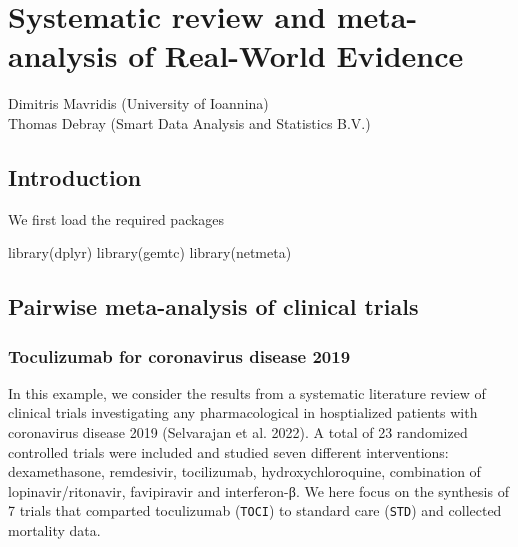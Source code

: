 \documentclass[
  letterpaper,
  DIV=11,
  numbers=noendperiod]{scrreprt}
\newenvironment{Shaded}{\begin{snugshade}}{\end{snugshade}}
\newcommand{\FunctionTok}[1]{\textcolor[rgb]{0.28,0.35,0.67}{#1}}
\newcommand{\NormalTok}[1]{\textcolor[rgb]{0.00,0.23,0.31}{#1}}
\begin{document}

\hypertarget{systematic-review-and-meta-analysis-of-real-world-evidence}{%
\chapter{Systematic review and meta-analysis of Real-World
Evidence}\label{systematic-review-and-meta-analysis-of-real-world-evidence}}

Dimitris Mavridis (University of Ioannina)\\
Thomas Debray (Smart Data Analysis and Statistics B.V.)

\hfill\break

\hypertarget{introduction-1}{%
\section{Introduction}\label{introduction-1}}

We first load the required packages

\begin{Shaded}
\begin{Highlighting}[]
\FunctionTok{library}\NormalTok{(dplyr)}
\FunctionTok{library}\NormalTok{(gemtc)}
\FunctionTok{library}\NormalTok{(netmeta)}
\end{Highlighting}
\end{Shaded}

\hypertarget{pairwise-meta-analysis-of-clinical-trials}{%
\section{Pairwise meta-analysis of clinical
trials}\label{pairwise-meta-analysis-of-clinical-trials}}

\hypertarget{toculizumab-for-coronavirus-disease-2019}{%
\subsection{Toculizumab for coronavirus disease
2019}\label{toculizumab-for-coronavirus-disease-2019}}

In this example, we consider the results from a systematic literature
review of clinical trials investigating any pharmacological in
hosptialized patients with coronavirus disease 2019 (Selvarajan et al.
2022). A total of 23 randomized controlled trials were included and
studied seven different interventions: dexamethasone, remdesivir,
tocilizumab, hydroxychloroquine, combination of lopinavir/ritonavir,
favipiravir and interferon-β. We here focus on the synthesis of 7 trials
that comparted toculizumab (\texttt{TOCI}) to standard care
(\texttt{STD}) and collected mortality data.
\end{document}
